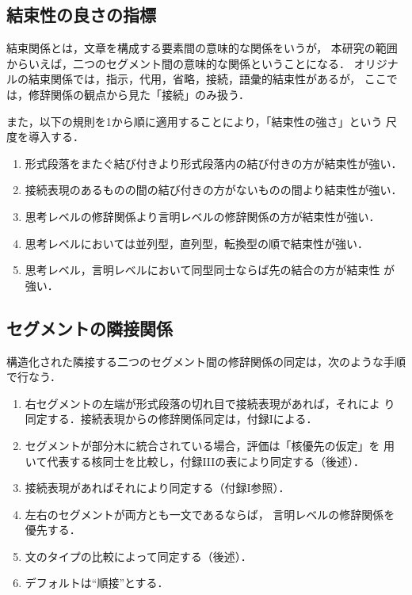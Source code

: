 \subsection{結束性の良さの指標} \label{tuyosa}

結束関係とは，文章を構成する要素間の意味的な関係をいう\cite{Halliday:76}が，
本研究の範囲からいえば，二つのセグメント間の意味的な関係ということになる．
オリジナルの結束関係では，指示，代用，省略，接続，語彙的結束性があるが，
ここでは，修辞関係の観点から見た「接続」のみ扱う．

また，以下の規則を1から順に適用することにより，「結束性の強さ」という
尺度を導入する．
\begin{enumerate}
 \item 形式段落をまたぐ結び付きより形式段落内の結び付きの方が結束性が強い．
 \item 接続表現のあるものの間の結び付きの方がないものの間より結束性が強い．
 \item 思考レベルの修辞関係より言明レベルの修辞関係の方が結束性が強い．
 \item 思考レベルにおいては並列型，直列型，転換型の順で結束性が強い．
 \item 思考レベル，言明レベルにおいて同型同士ならば先の結合の方が結束性
       が強い．
\end{enumerate}

\subsection{セグメントの隣接関係}

構造化された隣接する二つのセグメント間の修辞関係の同定は，次のような手順
で行なう．

\begin{enumerate}
 \item 右セグメントの左端が形式段落の切れ目で接続表現があれば，それによ
       り同定する．接続表現からの修辞関係同定は，付録Iによる．
 \item セグメントが部分木に統合されている場合，評価は「核優先の仮定」を
       用いて代表する核同士を比較し，付録IIIの表により同定する（後述）．
 \item 接続表現があればそれにより同定する（付録I参照）．
 \item 左右のセグメントが両方とも一文であるならば，
       言明レベルの修辞関係を優先する．
 \item 文のタイプの比較によって同定する（後述）．
 \item デフォルトは``順接''とする．
\end{enumerate}
     
